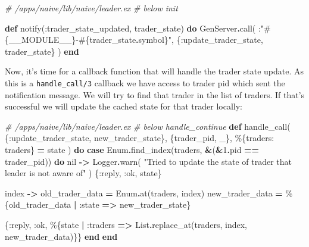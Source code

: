 \documentclass[
  oneside]{book}
\newenvironment{Shaded}{\begin{snugshade}}{\end{snugshade}}
\newcommand{\CommentTok}[1]{\textcolor[rgb]{0.56,0.35,0.01}{\textit{#1}}}
\newcommand{\ConstantTok}[1]{\textcolor[rgb]{0.00,0.00,0.00}{#1}}
\newcommand{\DecValTok}[1]{\textcolor[rgb]{0.00,0.00,0.81}{#1}}
\newcommand{\KeywordTok}[1]{\textcolor[rgb]{0.13,0.29,0.53}{\textbf{#1}}}
\newcommand{\NormalTok}[1]{#1}
\newcommand{\OperatorTok}[1]{\textcolor[rgb]{0.81,0.36,0.00}{\textbf{#1}}}
\newcommand{\OtherTok}[1]{\textcolor[rgb]{0.56,0.35,0.01}{#1}}
\newcommand{\StringTok}[1]{\textcolor[rgb]{0.31,0.60,0.02}{#1}}
\newcommand{\VariableTok}[1]{\textcolor[rgb]{0.00,0.00,0.00}{#1}}
\begin{document}
\begin{Shaded}
\begin{Highlighting}[]
  \CommentTok{\# /apps/naive/lib/naive/leader.ex}
  \CommentTok{\# below init}

  \KeywordTok{def}\NormalTok{ notify(}\VariableTok{:trader\_state\_updated}\NormalTok{, trader\_state) }\KeywordTok{do}
    \ConstantTok{GenServer}\OperatorTok{.}\NormalTok{call(}
\NormalTok{      :}\StringTok{"}\OtherTok{\#\{}\ConstantTok{\_\_MODULE\_\_}\OtherTok{\}}\StringTok{{-}}\OtherTok{\#\{}\NormalTok{trader\_state}\OperatorTok{.}\NormalTok{symbol}\OtherTok{\}}\StringTok{"}\NormalTok{,}
\NormalTok{      \{}\VariableTok{:update\_trader\_state}\NormalTok{, trader\_state\}}
\NormalTok{    )}
  \KeywordTok{end}
\end{Highlighting}
\end{Shaded}

Now, it's time for a callback function that will handle the trader state update. As this is a \texttt{handle\_call/3} callback we have access to trader pid which sent the notification message. We will try to find that trader in the list of traders. If that's successful we will update the cached state for that
trader locally:

\begin{Shaded}
\begin{Highlighting}[]
  \CommentTok{\# /apps/naive/lib/naive/leader.ex}
  \CommentTok{\# below handle\_continue}
  \KeywordTok{def}\NormalTok{ handle\_call(}
\NormalTok{    \{}\VariableTok{:update\_trader\_state}\NormalTok{, new\_trader\_state\},}
\NormalTok{    \{trader\_pid, \_\},}
\NormalTok{    \%\{}\VariableTok{traders:}\NormalTok{ traders\} }\OperatorTok{=}\NormalTok{ state}
\NormalTok{  ) }\KeywordTok{do}
    \KeywordTok{case} \ConstantTok{Enum}\OperatorTok{.}\NormalTok{find\_index(traders, }\OperatorTok{\&}\NormalTok{(}\OperatorTok{\&}\DecValTok{1}\OperatorTok{.}\NormalTok{pid }\OperatorTok{==}\NormalTok{ trader\_pid)) }\KeywordTok{do}
      \ConstantTok{nil} \OperatorTok{{-}\textgreater{}}
        \ConstantTok{Logger}\OperatorTok{.}\NormalTok{warn(}
          \StringTok{"Tried to update the state of trader that leader is not aware of"}
\NormalTok{        )}
\NormalTok{        \{}\VariableTok{:reply}\NormalTok{, }\VariableTok{:ok}\NormalTok{, state\}}
      
\NormalTok{      index }\OperatorTok{{-}\textgreater{}}
\NormalTok{        old\_trader\_data }\OperatorTok{=} \ConstantTok{Enum}\OperatorTok{.}\NormalTok{at(traders, index)}
\NormalTok{        new\_trader\_data }\OperatorTok{=}\NormalTok{ \%\{old\_trader\_data }\OperatorTok{|} \VariableTok{:state} \OperatorTok{=\textgreater{}}\NormalTok{ new\_trader\_state\}}

\NormalTok{        \{}\VariableTok{:reply}\NormalTok{, }\VariableTok{:ok}\NormalTok{, \%\{state }\OperatorTok{|} \VariableTok{:traders} \OperatorTok{=\textgreater{}}
          \ConstantTok{List}\OperatorTok{.}\NormalTok{replace\_at(traders, index, new\_trader\_data)\}\}}
    \KeywordTok{end}
  \KeywordTok{end}
\end{Highlighting}
\end{Shaded}
\end{document}
